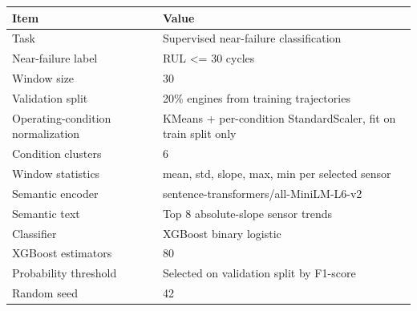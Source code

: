 \begin{tabular}{ll}
\toprule
Item & Value \\
\midrule
Task & Supervised near-failure classification \\
Near-failure label & RUL <= 30 cycles \\
Window size & 30 \\
Validation split & 20\% engines from training trajectories \\
Operating-condition normalization & KMeans + per-condition StandardScaler, fit on train split only \\
Condition clusters & 6 \\
Window statistics & mean, std, slope, max, min per selected sensor \\
Semantic encoder & sentence-transformers/all-MiniLM-L6-v2 \\
Semantic text & Top 8 absolute-slope sensor trends \\
Classifier & XGBoost binary logistic \\
XGBoost estimators & 80 \\
Probability threshold & Selected on validation split by F1-score \\
Random seed & 42 \\
\bottomrule
\end{tabular}
